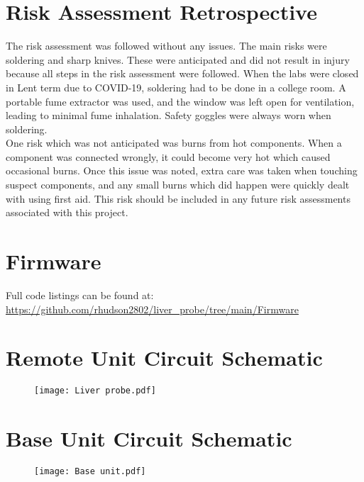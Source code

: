 \section{Risk Assessment Retrospective}
The risk assessment was followed without any issues. The main risks were soldering and sharp knives. These were anticipated and did not result in injury because all steps in the risk assessment were followed. When the labs were closed in Lent term due to COVID-19, soldering had to be done in a college room. A portable fume extractor was used, and the window was left open for ventilation, leading to minimal fume inhalation. Safety goggles were always worn when soldering.\\

One risk which was not anticipated was burns from hot components. When a component was connected wrongly, it could become very hot which caused occasional burns. Once this issue was noted, extra care was taken when touching suspect components, and any small burns which did happen were quickly dealt with using first aid. This risk should be included in any future risk assessments associated with this project.


\section{Firmware}
Full code listings can be found at:\\
\url{https://github.com/rhudson2802/liver_probe/tree/main/Firmware}

\newpage
\singlespacing
\begin{landscape}
\section{Remote Unit Circuit Schematic}
\vspace{-5mm}
\begin{figure}[h!]
	\centering
	\texttt{[image: Liver probe.pdf]}
\end{figure}

\section{Base Unit Circuit Schematic}
\vspace{-5mm}
\begin{figure}[h!]
	\centering
	\texttt{[image: Base unit.pdf]}
\end{figure}
\end{landscape}



